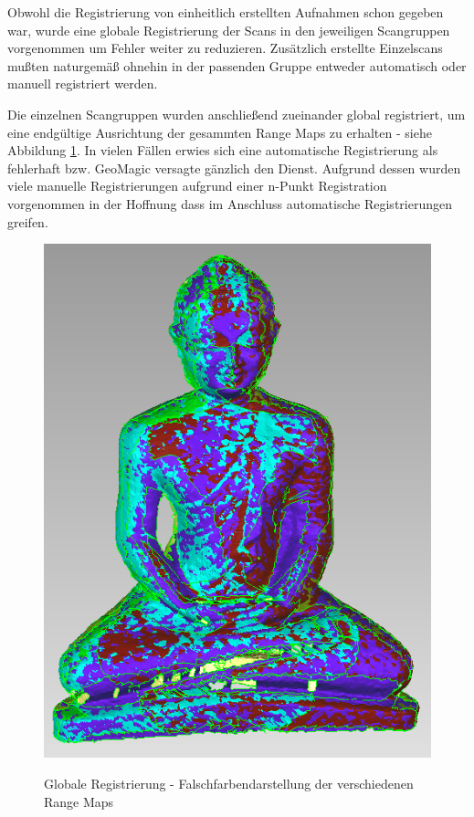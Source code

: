 \documentclass[]{article}
\begin{document}
Obwohl die Registrierung von einheitlich erstellten Aufnahmen schon gegeben war, wurde eine globale Registrierung der Scans in den jeweiligen Scangruppen vorgenommen um Fehler weiter zu reduzieren. Zusätzlich erstellte Einzelscans mußten naturgemäß ohnehin in der passenden Gruppe entweder automatisch oder manuell registriert werden.

Die einzelnen Scangruppen wurden anschließend zueinander global registriert, um eine endgültige Ausrichtung der gesammten Range Maps zu erhalten - siehe Abbildung \ref{fig:budhaGlobal}. In vielen Fällen erwies sich eine automatische Registrierung als fehlerhaft bzw. GeoMagic versagte gänzlich den Dienst. Aufgrund dessen wurden viele manuelle Registrierungen aufgrund einer n-Punkt Registration vorgenommen in der Hoffnung dass im Anschluss automatische Registrierungen greifen.

\begin{figure}[H]
\centering
\caption{Globale Registrierung - Falschfarbendarstellung der verschiedenen Range Maps}
\includegraphics[scale=0.35]{images/GeoMagicBudhaPictures/Budha_Scans_Aufrecht_globalRegistration_2.PNG}
\label{fig:budhaGlobal}
\end{figure}
\end{document}

